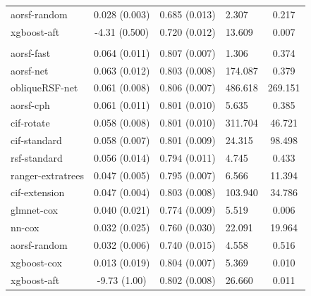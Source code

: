 \documentclass[twoside,11pt]{article}\usepackage[]{graphicx}\usepackage[]{xcolor}
\newenvironment{knitrout}{}{} %
\begin{document}
\begin{knitrout}
\begin{longtable}[t]{lcclc}
\hspace{1em}aorsf-random & 0.028 (0.003) & 0.685 (0.013) & 2.307 & 0.217\\
\hspace{1em}xgboost-aft & -4.31 (0.500) & 0.720 (0.012) & 13.609 & 0.007\\
\addlinespace[0.3em]
\hline
\multicolumn{5}{l}{\textit{\textbf{MESA; coronary heart disease, n = 6785, p = 48}}}\\
\hline
\hspace{1em}aorsf-fast & 0.064 (0.011) & 0.807 (0.007) & 1.306 & 0.374\\
\hspace{1em}aorsf-net & 0.063 (0.012) & 0.803 (0.008) & 174.087 & 0.379\\
\hspace{1em}obliqueRSF-net & 0.061 (0.008) & 0.806 (0.007) & 486.618 & 269.151\\
\hspace{1em}aorsf-cph & 0.061 (0.011) & 0.801 (0.010) & 5.635 & 0.385\\
\hspace{1em}cif-rotate & 0.058 (0.008) & 0.801 (0.010) & 311.704 & 46.721\\
\hspace{1em}cif-standard & 0.058 (0.007) & 0.801 (0.009) & 24.315 & 98.498\\
\hspace{1em}rsf-standard & 0.056 (0.014) & 0.794 (0.011) & 4.745 & 0.433\\
\hspace{1em}ranger-extratrees & 0.047 (0.005) & 0.795 (0.007) & 6.566 & 11.394\\
\hspace{1em}cif-extension & 0.047 (0.004) & 0.803 (0.008) & 103.940 & 34.786\\
\hspace{1em}glmnet-cox & 0.040 (0.021) & 0.774 (0.009) & 5.519 & 0.006\\
\hspace{1em}nn-cox & 0.032 (0.025) & 0.760 (0.030) & 22.091 & 19.964\\
\hspace{1em}aorsf-random & 0.032 (0.006) & 0.740 (0.015) & 4.558 & 0.516\\
\hspace{1em}xgboost-cox & 0.013 (0.019) & 0.804 (0.007) & 5.369 & 0.010\\
\hspace{1em}xgboost-aft & -9.73 (1.00) & 0.802 (0.008) & 26.660 & 0.011\\

\end{longtable}
\end{knitrout}
\end{document}
